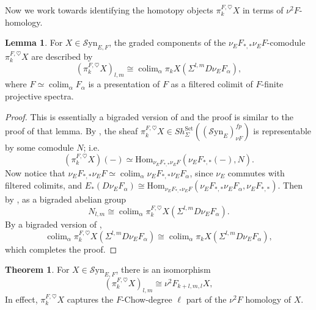 \documentclass[10pt]{amsart}
\theoremstyle{definition}
\numberwithin{figure}{section}
\numberwithin{equation}{section}
\newtheorem{theorem}[figure]{Theorem}
\newtheorem{lemma}[figure]{Lemma}
\theoremstyle{cited}
\newcommand{\colim}{\operatorname{colim}}
\newcommand{\Hom}{\mathrm{Hom}}
\newcommand{\Syn}{\mathcal{S}\mathrm{yn}}
\begin{document}
  Now we work towards identifying the homotopy objects $\pi_k^{F,\heartsuit}X$ in terms of $\nu^2F$-homology.
  
  \begin{lemma}
  \label{F_dual_tstruct_lemma}
      For $X\in\Syn_{E,F}$, the graded components of the $\nu_EF_{*,*}\nu_EF$-comodule $\pi_k^{F,\heartsuit}X$ are described by
      $$
  (\pi_k^{F,\heartsuit}X)_{l,m} \cong \colim_\alpha \pi_kX(\Sigma^{l,m}D\nu_E F_\alpha),
      $$
      where $F\simeq \colim_\alpha F_\alpha$ is a presentation of $F$ as a filtered colimit of $F$-finite projective spectra.
  \end{lemma}
  
  \begin{proof}
      This is essentially a bigraded version of \cite[Lemma 4.17]{Pst22} and the proof is similar to the proof of that lemma. By \cite[Thm. 2.58]{Pst22}, the sheaf $\pi_k^{F,\heartsuit}X\in Sh_{\Sigma}^{\mathrm{Set}}((\Syn_E)_{\nu F}^{fp})$ is representable by some comodule $N$; i.e. $$(\pi_k^{F,\heartsuit}X)(-)\simeq \Hom_{\nu_EF_{*,*}\nu_EF}(\nu_EF_{*,*}(-),N).$$
      Now notice that $\nu_EF_{*,*}\nu_EF\simeq \colim_\alpha \nu_EF_{*,*}\nu_EF_\alpha$, since $\nu_E$ commutes with filtered colimits, and $E_*(D\nu_EF_\alpha)\cong\Hom_{\nu_EF_{*,*}\nu_EF}(\nu_EF_{*,*}\nu_EF_\alpha,\nu_EF_{*,*})$. Then by \cite[Lemma 3.3]{Pst22}, as a bigraded abelian group
      $$
  N_{l,m}\cong \colim_\alpha \pi_k^{F,\heartsuit}X(\Sigma^{l,m}D\nu_EF_\alpha).
      $$
      By a bigraded version of \cite[Lemma 3.25]{Pst22},
      $$
  \colim_{\alpha}\pi_k^{F,\heartsuit}X(\Sigma^{l,m}D\nu_EF_\alpha)\cong\colim_{\alpha} \pi_kX(\Sigma^{l,m}D\nu_EF_\alpha),
      $$
      which completes the proof.
  \end{proof}
  
  \begin{theorem}
  \label{F_homol_tstruct_theorem}
      For $X\in\Syn_{E,F}$, there is an isomorphism
      \[
          (\pi_k^{F,\heartsuit}X)_{l,m}\cong\nu^2F_{k+l,m,l}X,
      \]
      In effect, $\pi_k^{F,\heartsuit}X$ captures the $F$-Chow-degree $\ell$ part of the $\nu^2F$ homology of $X$.
  \end{theorem}
  
\end{document}
